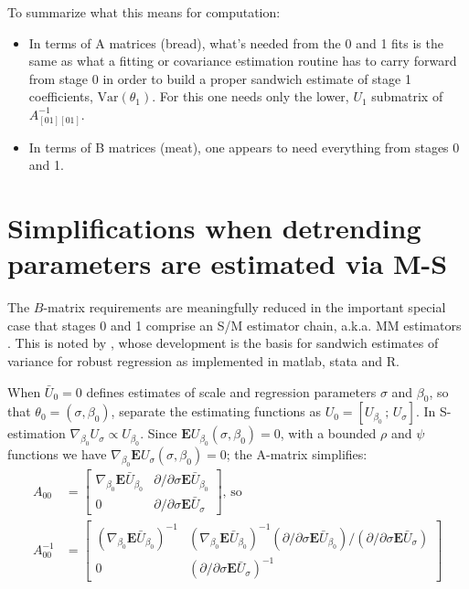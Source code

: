 \documentclass[12pt]{article}
\newcommand{\EE}{\mathbf{E}}
\newcommand{\var}{\mathrm{Var}}
\begin{document}
To summarize what this means for computation:

\begin{itemize}
\item In terms of A matrices (bread), what's needed from the 0 and 1
  fits is the same as what a fitting or covariance estimation routine
  has to carry forward from stage 0 in order to build a proper
  sandwich estimate of stage 1 coefficients, $\var (\theta_{1})$.  For
  this one needs only the lower, $U_{1}$ submatrix of
  $A_{[01][01]}^{-1}$.
\item In terms of B matrices (meat), one appears to need everything
  from stages 0 and 1. 
\end{itemize}

 
\section*{Simplifications when detrending parameters are estimated via M-S}

The $B$-matrix requirements are meaningfully reduced in
the important  special case that stages 0 and 1 comprise an
S/M estimator chain, a.k.a. MM estimators
\citet{yohai1987highefficiencyrobust}.  This is noted by \citet*{crouxetal2004robustSEforrobustreg},
whose development is the basis for sandwich estimates of variance for
robust regression as implemented in matlab, stata and R. 


When $\bar{U}_{0} = 0$ defines estimates of scale and regression
parameters $\sigma$ and $\beta_{0}$, so that $\theta_{0} =
(\sigma, \beta_{0})$, separate the estimating functions as $U_{0} = [U_{\beta_{0}} \, ; \,
U_{\sigma} ]$.  In S-estimation $\nabla_{\beta_{0}} 
U_{\sigma} \propto U_{\beta_{0}}$. Since  $\EE
U_{\beta_{0}}(\sigma, \beta_{0}) = 0$, with a bounded $\rho$ and
$\psi$ functions we have $\nabla_{\beta_{0}}
\EE U_{\sigma}(\sigma, \beta_{0}) =0$; the A-matrix simplifies:
\begin{align*}
  A_{00} &= \left[
    \begin{array}{cc}
      \nabla_{\beta_{0}} \EE \bar{U}_{\beta_{0}} & \partial/{\partial \sigma}
                                                  \EE
                                                  \bar{U}_{\beta_{0}}
      \\
      0 & \partial/{\partial \sigma} \EE \bar{U}_{\sigma}
    \end{array}
\right] , \, \mathrm{so} \\
 A_{00}^{-1} &= \left[
    \begin{array}{cc}
      (\nabla_{\beta_{0}} \EE \bar{U}_{\beta_{0}})^{-1} & (\nabla_{\beta_{0}} \EE \bar{U}_{\beta_{0}})^{-1} (\partial/{\partial \sigma}
                                                  \EE
                                                  \bar{U}_{\beta_{0}})/(\partial/{\partial \sigma} \EE \bar{U}_{\sigma})
      \\
      0 &(\partial/{\partial \sigma} \EE \bar{U}_{\sigma})^{-1}
    \end{array}
\right]
\end{align*}
\end{document}
